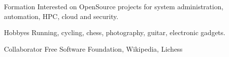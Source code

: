 \begin{cvskills}

\cvskill
{Formation}
{Interested on OpenSource projects for system administration, automation, HPC, cloud and security.}

\cvskill
{Hobbyes}
{Running, cycling, chess, photography, guitar, electronic gadgets.}

\cvskill
{Collaborator}
{Free Software Foundation, Wikipedia, Lichess}
\end{cvskills}